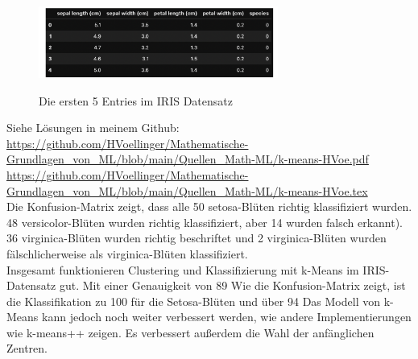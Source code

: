 \documentclass[12pt]{article}
\begin{document}
\begin{figure}[htp]
  \centering
  \hspace*{-0.1cm} 
  \includegraphics[width=0.7\textwidth]{IRIS-Dataset-First_Entries}\\
  \caption{Die ersten 5 Entries im IRIS Datensatz}
  \label{fig:Iris_DS}
\end{figure}
Siehe Lösungen in meinem Github:\\ 
%
\url{https://github.com/HVoellinger/Mathematische-Grundlagen_von_ML/blob/main/Quellen_Math-ML/k-means-HVoe.pdf} \\
%
\url{https://github.com/HVoellinger/Mathematische-Grundlagen_von_ML/blob/main/Quellen_Math-ML/k-means-HVoe.tex}\\[0.3cm]
%
Die Konfusion-Matrix zeigt, dass alle 50 setosa-Blüten richtig klassifiziert  wurden. 48 versicolor-Blüten wurden richtig klassifiziert, aber 14 wurden falsch erkannt). 36 virginica-Blüten wurden richtig beschriftet und 2 virginica-Blüten wurden fälschlicherweise als virginica-Blüten klassifiziert.\\
%
Insgesamt funktionieren  Clustering und Klassifizierung mit k-Means im IRIS-Datensatz gut. Mit einer Genauigkeit von 89%
Wie die Konfusion-Matrix zeigt, ist die Klassifikation zu 100%
für die Setosa-Blüten und über 94 %
Das Modell von k-Means kann jedoch noch weiter verbessert werden, wie andere  Implementierungen wie k-means++ zeigen. Es verbessert außerdem die Wahl der anfänglichen Zentren.

\newpage

{\color{red}{***********************************************************************\\ 
Ab hier bis Ende der Übungen sind die Folien der Vorlesung ML  zu nutzen und diese sind in Latex umzusetzen...\\
************************************************************************}}\\[0.2cm]
\end{document}
